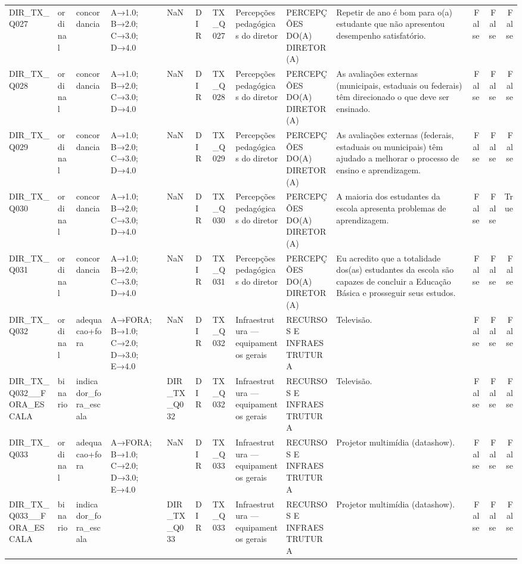 \begin{tabular}{llllllllllrrr}
DIR\_TX\_Q027 & ordinal & concordancia & A→1.0; B→2.0; C→3.0; D→4.0 & NaN & DIR & TX\_Q027 & Percepções pedagógicas do diretor & PERCEPÇÕES DO(A) DIRETOR(A) & Repetir de ano é bom para o(a) estudante que não apresentou desempenho satisfatório. & False & False & False \\
DIR\_TX\_Q028 & ordinal & concordancia & A→1.0; B→2.0; C→3.0; D→4.0 & NaN & DIR & TX\_Q028 & Percepções pedagógicas do diretor & PERCEPÇÕES DO(A) DIRETOR(A) & As avaliações externas (municipais, estaduais ou federais) têm direcionado o que deve ser ensinado. & False & False & False \\
DIR\_TX\_Q029 & ordinal & concordancia & A→1.0; B→2.0; C→3.0; D→4.0 & NaN & DIR & TX\_Q029 & Percepções pedagógicas do diretor & PERCEPÇÕES DO(A) DIRETOR(A) & As avaliações externas (federais, estaduais ou municipais) têm ajudado a melhorar o processo de ensino e aprendizagem. & False & False & False \\
DIR\_TX\_Q030 & ordinal & concordancia & A→1.0; B→2.0; C→3.0; D→4.0 & NaN & DIR & TX\_Q030 & Percepções pedagógicas do diretor & PERCEPÇÕES DO(A) DIRETOR(A) & A maioria dos estudantes da escola apresenta problemas de aprendizagem. & False & False & True \\
DIR\_TX\_Q031 & ordinal & concordancia & A→1.0; B→2.0; C→3.0; D→4.0 & NaN & DIR & TX\_Q031 & Percepções pedagógicas do diretor & PERCEPÇÕES DO(A) DIRETOR(A) & Eu acredito que a totalidade dos(as) estudantes da escola são capazes de concluir a Educação Básica e prosseguir seus estudos. & False & False & False \\
DIR\_TX\_Q032 & ordinal & adequacao+fora & A→FORA; B→1.0; C→2.0; D→3.0; E→4.0 & NaN & DIR & TX\_Q032 & Infraestrutura — equipamentos gerais & RECURSOS E INFRAESTRUTURA & Televisão. & False & False & False \\
DIR\_TX\_Q032\_\_FORA\_ESCALA & binario & indicador\_fora\_escala &  & DIR\_TX\_Q032 & DIR & TX\_Q032 & Infraestrutura — equipamentos gerais & RECURSOS E INFRAESTRUTURA & Televisão. & False & False & False \\
DIR\_TX\_Q033 & ordinal & adequacao+fora & A→FORA; B→1.0; C→2.0; D→3.0; E→4.0 & NaN & DIR & TX\_Q033 & Infraestrutura — equipamentos gerais & RECURSOS E INFRAESTRUTURA & Projetor multimídia (datashow). & False & False & False \\
DIR\_TX\_Q033\_\_FORA\_ESCALA & binario & indicador\_fora\_escala &  & DIR\_TX\_Q033 & DIR & TX\_Q033 & Infraestrutura — equipamentos gerais & RECURSOS E INFRAESTRUTURA & Projetor multimídia (datashow). & False & False & False \\

\end{tabular}
